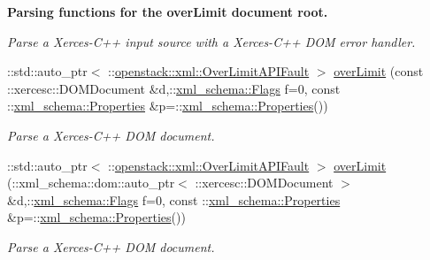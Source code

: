 \begin{Indent}{\bf Parsing functions for the overLimit document root.}
\begin{DoxyCompactItemize}
\begin{DoxyCompactList}\small\item\em Parse a Xerces-\/C++ input source with a Xerces-\/C++ DOM error handler. \item\end{DoxyCompactList}\item 
::std::auto\_\-ptr$<$ ::\hyperlink{classopenstack_1_1xml_1_1OverLimitAPIFault}{openstack::xml::OverLimitAPIFault} $>$ \hyperlink{namespaceopenstack_1_1xml_a22e205c4d1105ab29aa5fef30cf73158}{overLimit} (const ::xercesc::DOMDocument \&d,::\hyperlink{namespacexml__schema_affb4c227cbd9aa7453dd1dc5a1401943}{xml\_\-schema::Flags} f=0, const ::\hyperlink{namespacexml__schema_ad27ce19a7ee1d3b1064092648898f64c}{xml\_\-schema::Properties} \&p=::\hyperlink{namespacexml__schema_ad27ce19a7ee1d3b1064092648898f64c}{xml\_\-schema::Properties}())
\begin{DoxyCompactList}\small\item\em Parse a Xerces-\/C++ DOM document. \item\end{DoxyCompactList}\item 
::std::auto\_\-ptr$<$ ::\hyperlink{classopenstack_1_1xml_1_1OverLimitAPIFault}{openstack::xml::OverLimitAPIFault} $>$ \hyperlink{namespaceopenstack_1_1xml_a922a86dfae6755edb25a608ec5c86f02}{overLimit} (::xml\_\-schema::dom::auto\_\-ptr$<$ ::xercesc::DOMDocument $>$ \&d,::\hyperlink{namespacexml__schema_affb4c227cbd9aa7453dd1dc5a1401943}{xml\_\-schema::Flags} f=0, const ::\hyperlink{namespacexml__schema_ad27ce19a7ee1d3b1064092648898f64c}{xml\_\-schema::Properties} \&p=::\hyperlink{namespacexml__schema_ad27ce19a7ee1d3b1064092648898f64c}{xml\_\-schema::Properties}())
\begin{DoxyCompactList}\small\item\em Parse a Xerces-\/C++ DOM document. \item\end{DoxyCompactList}\end{DoxyCompactItemize}
\end{Indent}
